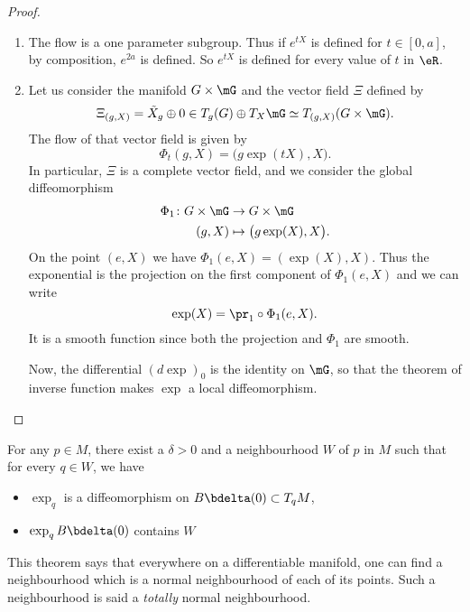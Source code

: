 \begin{proof}
	\begin{enumerate}

		\item
			The flow is a one parameter subgroup. Thus if $ e^{tX}$ is defined for $t\in[0,a]$, by composition, $ e^{2a}$ is defined. So $ e^{tX}$ is defined for every value of $t$ in $\eR$.
		\item
			Let us consider the manifold $G\times \mG$ and the vector field $\Xi$ defined by
			\begin{equation}
				\Xi_{(g,X)}=\tilde X_g\oplus 0\in T_g(G)\oplus T_X\mG\simeq T_{(g,X)}(G\times \mG).
			\end{equation}
			The flow of that vector field is given by
			\begin{equation}
				\Phi_t(g,X)=\big( g\exp(tX),X \big).
			\end{equation}
			In particular, $\Xi$ is a complete vector field, and we consider the global diffeomorphism
			\begin{equation}
				\begin{aligned}
					\Phi_1\colon G\times \mG&\to G\times \mG \\
					(g,X)&\mapsto \big( g\exp(X),X \big). 
				\end{aligned}
			\end{equation}
			On the point $(e,X)$ we have $\Phi_1(e,X)=(\exp(X),X)$. Thus the exponential is the projection on the first component of $\Phi_1(e,X)$ and we can write
			\begin{equation}
				\exp(X)=\pr_1\circ\Phi_1(e,X).
			\end{equation}
			It is a smooth function since both the projection and $\Phi_1$ are smooth.

			Now, the differential $(d\exp)_0$ is the identity on $\mG$, so that the theorem of inverse function makes $\exp$ a local diffeomorphism.
	\end{enumerate}	
\end{proof}


\begin{theorem}
For any $p\in M$, there exist a $\delta>0$ and a neighbourhood $W$ of $p$ in $M$ such that for every $q\in W$, we have

\begin{itemize}
\item $\exp_q$ is a diffeomorphism on $B\bdelta(0)\subset T_qM$,
\item $\exp_q B\bdelta(0)$ contains $W$
\end{itemize}
\end{theorem}
This theorem says that everywhere on a differentiable manifold, one can find a neighbourhood which is a normal neighbourhood of each of its points. Such a neighbourhood is said a \emph{totally} normal neighbourhood.

